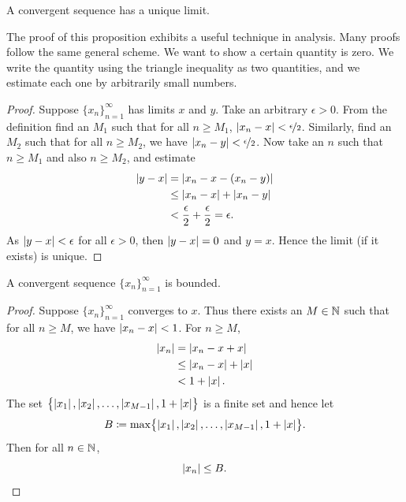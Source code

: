 \begin{prop} \label{prop:limisunique}
A convergent sequence has a unique limit.
\end{prop}

The proof of this proposition exhibits a useful technique in
analysis.  Many proofs follow the same general scheme.  We want to
show a certain quantity is zero.  We write the quantity using the 
triangle inequality as two quantities, and we estimate each one
by arbitrarily small numbers.

\begin{proof}
Suppose $\{ x_n \}_{n=1}^\infty$ has limits $x$ and $y$.
Take an arbitrary $\epsilon > 0$.
From the definition find an $M_1$ such that for all $n \geq M_1$,
$\left\lvert {x_n-x} \right\rvert < \nicefrac{\epsilon}{2}$.  Similarly, find an $M_2$
such that for all $n \geq M_2$, we have
$\left\lvert {x_n-y} \right\rvert < \nicefrac{\epsilon}{2}$.
Now take an $n$ such that $n \geq M_1$ and also $n \geq M_2$, and estimate
\begin{equation*}
\begin{split}
\left\lvert {y-x} \right\rvert
& =
\left\lvert {x_n-x - (x_n -y)} \right\rvert \\
& \leq
\left\lvert {x_n-x} \right\rvert + \left\lvert {x_n -y} \right\rvert \\
& <
\frac{\epsilon}{2} + \frac{\epsilon}{2} = \epsilon .
\end{split}
\end{equation*}
As $\left\lvert {y-x} \right\rvert < \epsilon$ for all $\epsilon > 0$, then $\left\lvert {y-x} \right\rvert = 0$
and $y=x$.  Hence the limit (if it exists) is unique.
\end{proof}

\begin{prop}
A convergent sequence $\{ x_n \}_{n=1}^\infty$ is bounded.
\end{prop}

\begin{proof}
Suppose $\{ x_n \}_{n=1}^\infty$ converges to $x$.  Thus there exists an $M \in {\mathbb{N}}$
such that for all $n \geq M$, we have
$\left\lvert {x_n - x} \right\rvert < 1$.  For $n \geq M$,
\begin{equation*}
\begin{split}
\left\lvert {x_n} \right\rvert & = \left\lvert {x_n - x + x} \right\rvert
\\
& \leq \left\lvert {x_n - x} \right\rvert + \left\lvert {x} \right\rvert
\\
& < 1 + \left\lvert {x} \right\rvert .
\end{split}
\end{equation*}
The set $\bigl\{ \left\lvert {x_1} \right\rvert, \left\lvert {x_2} \right\rvert, \ldots, \left\lvert {x_{M-1}} \right\rvert , 1+\lvert {x} \rvert \bigr\}$
is a finite set and hence let
\begin{equation*}
B \coloneqq \max \bigl\{ \left\lvert {x_1} \right\rvert, \left\lvert {x_2} \right\rvert, \ldots, \left\lvert {x_{M-1}} \right\rvert, 1+\lvert {x} \rvert \bigr\} .
\end{equation*}
Then for all $n \in {\mathbb{N}}$,
\begin{equation*}
\left\lvert {x_n} \right\rvert \leq B. \qedhere
\end{equation*}
\end{proof}

